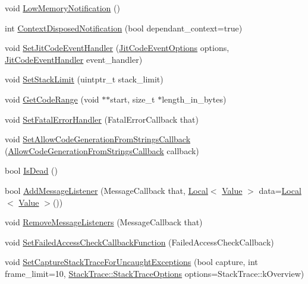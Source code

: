 \begin{DoxyCompactItemize}
\item 
void \hyperlink{classv8_1_1Isolate_aaf446f4877e4707a93d2c406fffd9fd6}{Low\+Memory\+Notification} ()
\item 
int \hyperlink{classv8_1_1Isolate_a4b5216bbb1792211422aee575d02f442}{Context\+Disposed\+Notification} (bool dependant\+\_\+context=true)
\item 
void \hyperlink{classv8_1_1Isolate_a71d976355bf47eb2dd09cd5d1279a40d}{Set\+Jit\+Code\+Event\+Handler} (\hyperlink{namespacev8_a06f34fa4fa4cfc8518366808d1d461c1}{Jit\+Code\+Event\+Options} options, \hyperlink{namespacev8_a39243bc91e63d64d111452fdb98c4733}{Jit\+Code\+Event\+Handler} event\+\_\+handler)
\item 
void \hyperlink{classv8_1_1Isolate_addbbe14af7efb92999ac3944bc9ffed5}{Set\+Stack\+Limit} (uintptr\+\_\+t stack\+\_\+limit)
\item 
void \hyperlink{classv8_1_1Isolate_a46c7fb2282970530c32740d7e5999b22}{Get\+Code\+Range} (void $\ast$$\ast$start, size\+\_\+t $\ast$length\+\_\+in\+\_\+bytes)
\item 
void \hyperlink{classv8_1_1Isolate_a131f1e2e6a80618ac3c8c266a041851d}{Set\+Fatal\+Error\+Handler} (Fatal\+Error\+Callback that)
\item 
void \hyperlink{classv8_1_1Isolate_ad91199faf0a599c69539af01f5df44e9}{Set\+Allow\+Code\+Generation\+From\+Strings\+Callback} (\hyperlink{namespacev8_a521d909ec201742a1cb35d50a8e2a3c2}{Allow\+Code\+Generation\+From\+Strings\+Callback} callback)
\item 
bool \hyperlink{classv8_1_1Isolate_a603a9bc7860d7936bce2dd45829869c3}{Is\+Dead} ()
\item 
bool \hyperlink{classv8_1_1Isolate_a1aaf99c9ce853fdece7a3b8fc4df49d5}{Add\+Message\+Listener} (Message\+Callback that, \hyperlink{classv8_1_1Local}{Local}$<$ \hyperlink{classv8_1_1Value}{Value} $>$ data=\hyperlink{classv8_1_1Local}{Local}$<$ \hyperlink{classv8_1_1Value}{Value} $>$())
\item 
void \hyperlink{classv8_1_1Isolate_a0319e55b26ba3ac51d867b37b917a21f}{Remove\+Message\+Listeners} (Message\+Callback that)
\item 
void \hyperlink{classv8_1_1Isolate_ab9ef29fc049d82e0c33994632b4f6ba6}{Set\+Failed\+Access\+Check\+Callback\+Function} (Failed\+Access\+Check\+Callback)
\item 
void \hyperlink{classv8_1_1Isolate_a0ea70b9953abf15184a20eba6aab389f}{Set\+Capture\+Stack\+Trace\+For\+Uncaught\+Exceptions} (bool capture, int frame\+\_\+limit=10, \hyperlink{classv8_1_1StackTrace_a9704e4a37949eb8eb8ccddbddf161492}{Stack\+Trace\+::\+Stack\+Trace\+Options} options=Stack\+Trace\+::k\+Overview)
$$
\end{DoxyCompactItemize}
